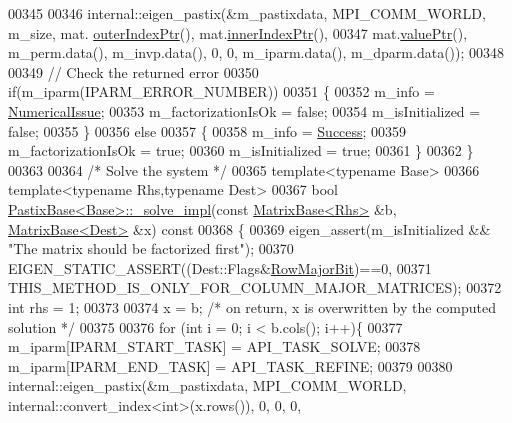 \begin{DoxyCode}
00345   
00346   internal::eigen\_pastix(&m\_pastixdata, MPI\_COMM\_WORLD, m\_size, mat.
      \hyperlink{group___sparse_core___module_a75506964d86d6badb32d0b4917acf2e2}{outerIndexPtr}(), mat.\hyperlink{group___sparse_core___module_ae7b804bd39745156d20ca1611a296b67}{innerIndexPtr}(),
00347                mat.\hyperlink{group___sparse_core___module_a9d4354d3f4d121d764bbed33cac05329}{valuePtr}(), m\_perm.data(), m\_invp.data(), 0, 0, m\_iparm.data(), m\_dparm.data());
00348   
00349   \textcolor{comment}{// Check the returned error}
00350   \textcolor{keywordflow}{if}(m\_iparm(IPARM\_ERROR\_NUMBER))
00351   \{
00352     m\_info = \hyperlink{group__enums_gga85fad7b87587764e5cf6b513a9e0ee5eaaf9b736d310a664e7729d163a035cc5f}{NumericalIssue};
00353     m\_factorizationIsOk = \textcolor{keyword}{false};
00354     m\_isInitialized = \textcolor{keyword}{false};
00355   \}
00356   \textcolor{keywordflow}{else}
00357   \{
00358     m\_info = \hyperlink{group__enums_gga85fad7b87587764e5cf6b513a9e0ee5ea52581b035f4b59c203b8ff999ef5fcea}{Success};
00359     m\_factorizationIsOk = \textcolor{keyword}{true};
00360     m\_isInitialized = \textcolor{keyword}{true};
00361   \}
00362 \}
00363 
00364 \textcolor{comment}{/* Solve the system */}
00365 \textcolor{keyword}{template}<\textcolor{keyword}{typename} Base>
00366 \textcolor{keyword}{template}<\textcolor{keyword}{typename} Rhs,\textcolor{keyword}{typename} Dest>
00367 \textcolor{keywordtype}{bool} \hyperlink{class_eigen_1_1_pastix_base}{PastixBase<Base>::\_solve\_impl}(\textcolor{keyword}{const} 
      \hyperlink{group___core___module_class_eigen_1_1_matrix_base}{MatrixBase<Rhs>} &b, \hyperlink{group___core___module_class_eigen_1_1_matrix_base}{MatrixBase<Dest>} &x)\textcolor{keyword}{ const}
00368 \textcolor{keyword}{}\{
00369   eigen\_assert(m\_isInitialized && \textcolor{stringliteral}{"The matrix should be factorized first"});
00370   EIGEN\_STATIC\_ASSERT((Dest::Flags&\hyperlink{group__flags_gae4f56c2a60bbe4bd2e44c5b19cbe8762}{RowMajorBit})==0,
00371                      THIS\_METHOD\_IS\_ONLY\_FOR\_COLUMN\_MAJOR\_MATRICES);
00372   \textcolor{keywordtype}{int} rhs = 1;
00373   
00374   x = b; \textcolor{comment}{/* on return, x is overwritten by the computed solution */}
00375   
00376   \textcolor{keywordflow}{for} (\textcolor{keywordtype}{int} i = 0; i < b.cols(); i++)\{
00377     m\_iparm[IPARM\_START\_TASK]          = API\_TASK\_SOLVE;
00378     m\_iparm[IPARM\_END\_TASK]            = API\_TASK\_REFINE;
00379   
00380     internal::eigen\_pastix(&m\_pastixdata, MPI\_COMM\_WORLD, internal::convert\_index<int>(x.rows()), 0, 0, 0,

\end{DoxyCode}
